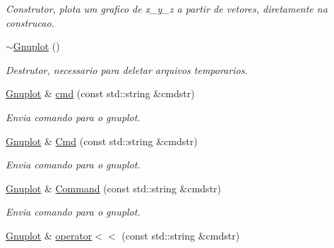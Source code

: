 \begin{DoxyCompactItemize}
\begin{DoxyCompactList}\small\item\em Construtor, plota um grafico de x\-\_\-y\-\_\-z a partir de vetores, diretamente na construcao. \end{DoxyCompactList}\item 
\hypertarget{classGnuplot_a78a68f621caa87d1f34324fcd093c7bd}{\hyperlink{classGnuplot_a78a68f621caa87d1f34324fcd093c7bd}{$\sim$\-Gnuplot} ()}\label{classGnuplot_a78a68f621caa87d1f34324fcd093c7bd}

\begin{DoxyCompactList}\small\item\em Destrutor, necessario para deletar arquivos temporarios. \end{DoxyCompactList}\item 
\hypertarget{classGnuplot_a07607803ede8dd5416906df0a1924fc5}{\hyperlink{classGnuplot}{Gnuplot} \& \hyperlink{classGnuplot_a07607803ede8dd5416906df0a1924fc5}{cmd} (const std\-::string \&cmdstr)}\label{classGnuplot_a07607803ede8dd5416906df0a1924fc5}

\begin{DoxyCompactList}\small\item\em Envia comando para o gnuplot. \end{DoxyCompactList}\item 
\hypertarget{classGnuplot_af9ffb5b4c18cdf7c56e5c446f72e515d}{\hyperlink{classGnuplot}{Gnuplot} \& \hyperlink{classGnuplot_af9ffb5b4c18cdf7c56e5c446f72e515d}{Cmd} (const std\-::string \&cmdstr)}\label{classGnuplot_af9ffb5b4c18cdf7c56e5c446f72e515d}

\begin{DoxyCompactList}\small\item\em Envia comando para o gnuplot. \end{DoxyCompactList}\item 
\hypertarget{classGnuplot_a0d6db1521e789d7b73415ce85b723046}{\hyperlink{classGnuplot}{Gnuplot} \& \hyperlink{classGnuplot_a0d6db1521e789d7b73415ce85b723046}{Command} (const std\-::string \&cmdstr)}\label{classGnuplot_a0d6db1521e789d7b73415ce85b723046}

\begin{DoxyCompactList}\small\item\em Envia comando para o gnuplot. \end{DoxyCompactList}\item 
\hypertarget{classGnuplot_ae56495dc15f23d32f099129d3a50dd6c}{\hyperlink{classGnuplot}{Gnuplot} \& \hyperlink{classGnuplot_ae56495dc15f23d32f099129d3a50dd6c}{operator$<$$<$} (const std\-::string \&cmdstr)}\label{classGnuplot_ae56495dc15f23d32f099129d3a50dd6c}


\end{DoxyCompactItemize}
